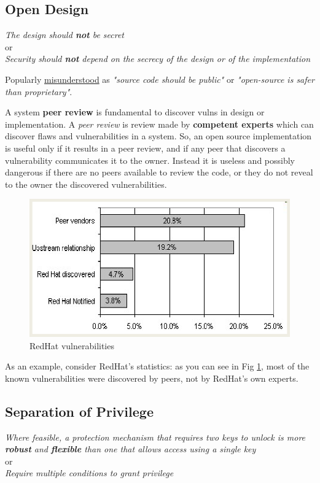 \subsection{Open Design}
\begin{center}
   
   \textit{The design should \textbf{not} be secret}\\
   or\\
   \textit{Security should \textbf{not} depend on the secrecy of
   the design or of the implementation}
\end{center}
Popularly \ul{misunderstood} as
\textit{"source code should be public"} or \textit{"open-source is safer than proprietary"}.

A system \textbf{peer review} is fundamental to discover vulns in
design or implementation.
A \textit{peer review} is review made by \textbf{competent experts} which can discover flaws and vulnerabilities in a system.
So, an open source implementation is useful only if it results in a peer review, and if any peer that discovers a vulnerability communicates it
to the owner.
Instead it is useless and possibly dangerous if there are no peers available to review the code,
or they do not reveal to the owner the discovered vulnerabilities.

\begin{figure}[htbp]
   \centering
   \includegraphics[width=0.45\columnwidth]{images/opendesign_redhat.png}
   \caption{RedHat vulnerabilities}
   \label{fig:opendesign_redhat}
\end{figure}
As an example, consider RedHat's statistics:
as you can see in Fig \ref{fig:opendesign_redhat}, most of the known vulnerabilities were discovered by peers,
not by RedHat's own experts.

\subsection{Separation of Privilege}
\begin{center}
   \textit{Where feasible, a protection mechanism that requires
   two keys to unlock is more \textbf{robust} and \textbf{flexible} than one
   that allows access using a single key}\\
   or\\
   \textit{Require multiple conditions to grant privilege}
\end{center}

